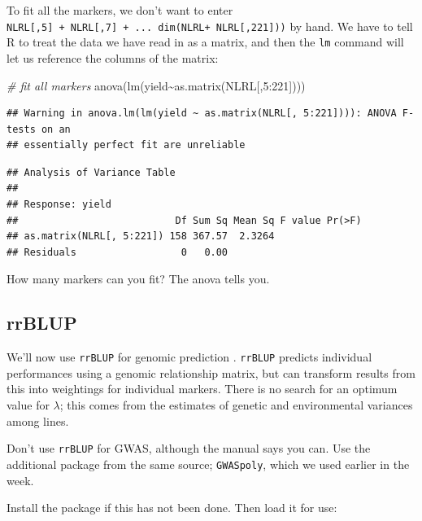 \documentclass[
]{book}
\makeatletter
\newenvironment{Shaded}{\begin{snugshade}}{\end{snugshade}}
\newcommand{\CommentTok}[1]{\textcolor[rgb]{0.56,0.35,0.01}{\textit{#1}}}
\newcommand{\DecValTok}[1]{\textcolor[rgb]{0.00,0.00,0.81}{#1}}
\newcommand{\FunctionTok}[1]{\textcolor[rgb]{0.00,0.00,0.00}{#1}}
\newcommand{\NormalTok}[1]{#1}
\newcommand{\SpecialCharTok}[1]{\textcolor[rgb]{0.00,0.00,0.00}{#1}}
\newenvironment{kframe}{%
\medskip{}
\setlength{\fboxsep}{.8em}
 \def\at@end@of@kframe{}%
 \ifinner\ifhmode%
  \def\at@end@of@kframe{\end{minipage}}%
  \begin{minipage}{\columnwidth}%
 \fi\fi%
 \def\FrameCommand##1{\hskip\@totalleftmargin \hskip-\fboxsep
 \colorbox{shadecolor}{##1}\hskip-\fboxsep
     \hskip-\linewidth \hskip-\@totalleftmargin \hskip\columnwidth}%
 \MakeFramed {\advance\hsize-\width
   \@totalleftmargin\z@ \linewidth\hsize
   \@setminipage}}%
 {\par\unskip\endMakeFramed%
 \at@end@of@kframe}
\newenvironment{rmdblock}[1]
  {
  \begin{itemize}
  \renewcommand{\labelitemi}{
    \raisebox{-.7\height}[0pt][0pt]{
      {\setkeys{Gin}{width=3em,keepaspectratio}\texttt{[image: images/\#1]}}
    }
  }
  \setlength{\fboxsep}{1em}
  \begin{kframe}
  \item
  }
  {
  \end{kframe}
  \end{itemize}
  }
\newenvironment{rmdnote}
  {\begin{rmdblock}{note}}
  {\end{rmdblock}}
\makeatother
\begin{document}
To fit all the markers, we don't want to enter \texttt{NLRL{[},5{]}\ +\ NLRL{[},7{]}\ +\ ...\ dim(NLRL+\ NLRL{[},221{]}))} by hand. We have to tell R to treat the data we have read in as a matrix, and then the \texttt{lm} command will let us reference the columns of the matrix:

\begin{Shaded}
\begin{Highlighting}[]
\CommentTok{\# fit all markers}
\FunctionTok{anova}\NormalTok{(}\FunctionTok{lm}\NormalTok{(yield}\SpecialCharTok{\textasciitilde{}}\FunctionTok{as.matrix}\NormalTok{(NLRL[,}\DecValTok{5}\SpecialCharTok{:}\DecValTok{221}\NormalTok{])))}
\end{Highlighting}
\end{Shaded}

\begin{verbatim}
## Warning in anova.lm(lm(yield ~ as.matrix(NLRL[, 5:221]))): ANOVA F-tests on an
## essentially perfect fit are unreliable
\end{verbatim}

\begin{verbatim}
## Analysis of Variance Table
## 
## Response: yield
##                           Df Sum Sq Mean Sq F value Pr(>F)
## as.matrix(NLRL[, 5:221]) 158 367.57  2.3264               
## Residuals                  0   0.00
\end{verbatim}

How many markers can you fit? The anova tells you.

\hypertarget{rrblup}{%
\subsection{rrBLUP}\label{rrblup}}

We'll now use \texttt{rrBLUP} for genomic prediction . \texttt{rrBLUP} predicts individual performances
using a genomic relationship matrix, but can transform results from this into weightings for
individual markers. There is no search for an optimum value for \(λ\); this comes from the
estimates of genetic and environmental variances among lines.

\begin{rmdnote}
Don't use \texttt{rrBLUP} for GWAS, although the manual says you can. Use the additional
package from the same source; \texttt{GWASpoly}, which we used earlier in the week.
\end{rmdnote}

Install the package if this has not been done. Then load it for use:
\end{document}
